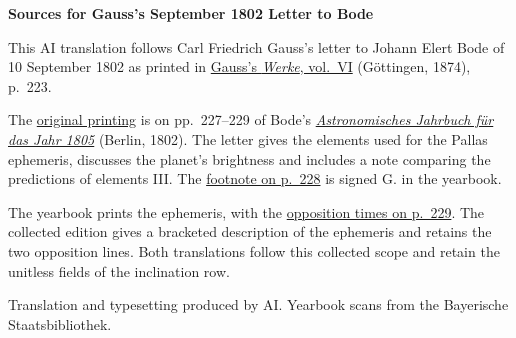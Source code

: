 \clearpage\thispagestyle{empty}
\begin{center}\textbf{Sources for Gauss’s September 1802 Letter to Bode}\end{center}
\noindent This AI translation follows Carl Friedrich Gauss’s letter to Johann Elert Bode of 10 September 1802 as printed in \href{https://gdz.sub.uni-goettingen.de/id/PPN236007467}{Gauss’s \textit{Werke}, vol.~VI} (Göttingen, 1874), p.~223.
\par\smallskip\noindent The \href{https://api.digitale-sammlungen.de/iiif/image/v2/bsb10538334_00237/full/1450,/0/default.jpg}{original printing} is on pp.~227--229 of Bode’s \href{https://wwwadd.zah.uni-heidelberg.de/publikationen/baj/baj1805/baj1805.htm}{\textit{Astronomisches Jahrbuch für das Jahr 1805}} (Berlin, 1802). The letter gives the elements used for the Pallas ephemeris, discusses the planet’s brightness and includes a note comparing the predictions of elements III. The \href{https://api.digitale-sammlungen.de/iiif/image/v2/bsb10538334_00238/full/1450,/0/default.jpg}{footnote on p.~228} is signed G. in the yearbook.
\par\smallskip\noindent The yearbook prints the ephemeris, with the \href{https://api.digitale-sammlungen.de/iiif/image/v2/bsb10538334_00239/full/1450,/0/default.jpg}{opposition times on p.~229}. The collected edition gives a bracketed description of the ephemeris and retains the two opposition lines. Both translations follow this collected scope and retain the unitless fields of the inclination row.
\par\smallskip\noindent Translation and typesetting produced by AI. Yearbook scans from the Bayerische Staatsbibliothek.
\clearpage

